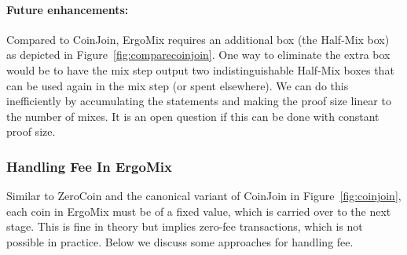 \documentclass[11pt]{article}
\newcommand{\mixname}{ErgoMix\xspace}
\begin{document}

\paragraph{Future enhancements:} Compared to CoinJoin, \mixname requires an additional box (the Half-Mix box) as depicted in Figure~\ref{fig:comparecoinjoin}. One way to eliminate the extra box would be to have the mix step output two indistinguishable Half-Mix boxes that can be used again in the mix step (or spent elsewhere). 
We can do this inefficiently by accumulating the statements and making the proof size linear to the number of mixes. It is an open question if this can be done with constant proof size.

\subsubsection{Handling Fee In \mixname}

Similar to ZeroCoin and the canonical variant of CoinJoin in Figure~\ref{fig:coinjoin}, each coin in \mixname must be of a fixed value, which is carried over to the next stage. 
This is fine in theory but implies zero-fee transactions, which is not possible in practice. Below we discuss some approaches for handling fee. 
\end{document}
